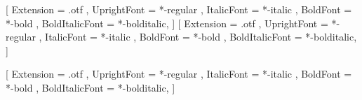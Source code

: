


\usepackage{fontspec} %
\setmainfont{texgyrepagella}[
Extension = .otf ,
UprightFont = *-regular ,
ItalicFont = *-italic ,
BoldFont = *-bold ,
BoldItalicFont = *-bolditalic,
]
\setsansfont{texgyreheros}[
Extension = .otf ,
UprightFont = *-regular ,
ItalicFont = *-italic ,
BoldFont = *-bold ,
BoldItalicFont = *-bolditalic,
]
\usepackage{unicode-math}
\setmonofont{texgyrecursor}[
Extension = .otf ,
UprightFont = *-regular ,
ItalicFont = *-italic ,
BoldFont = *-bold ,
BoldItalicFont = *-bolditalic,
]

